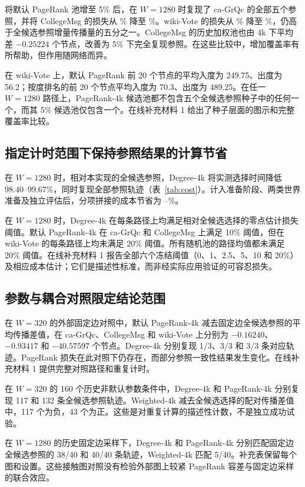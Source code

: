 \documentclass[smallextended]{svjour3}
\begin{document}
将默认 PageRank 池增至 5\% 后，在 $W=1280$ 时复现了 ca-GrQc 的全部五个参照，并将 CollegeMsg 的损失从 \CollegePRLoss{}\% 降至 \CollegePRfiveLoss{}\%。wiki-Vote 的损失从 \WikiPRLoss{}\% 降至 \WikiPRfiveLoss{}\%，仍高于全候选参照增量传播量的五分之一。CollegeMsg 的历史加权池也由 4k 下平均差 $-0.25224$ 个节点，改善为 5\% 下完全复现参照。在这些比较中，增加覆盖率有所帮助，但作用随网络而异。

在 wiki-Vote 上，默认 PageRank 前 20 个节点的平均入度为 249.75、出度为 56.2；按度排名的前 20 个节点平均入度为 70.3、出度为 489.25。在任一 $W=1280$ 路径上，PageRank-4k 候选池都不包含五个全候选参照种子中的任何一个，而其 5\% 候选池仅包含一个。在线补充材料 1 给出了种子层面的图示和完整覆盖率比较。

\subsection{指定计时范围下保持参照结果的计算节省}
在 $W=1280$ 时，相对本实现的全候选参照，Degree-4k 将实测选择时间降低 98.40--99.67\%，同时复现全部参照轨迹（表~\ref{tab:cost}）。计入准备阶段、两类世界准备及独立评估后，分项拼接的成本节省为 \CollegeDegreeSaving{}--\WikiDegreeSaving{}\%。


在 $W=1280$ 时，Degree-4k 在每条路径上均满足相对全候选选择的零点估计损失阈值。默认 PageRank-4k 在 ca-GrQc 和 CollegeMsg 上满足 10\% 阈值，但在 wiki-Vote 的每条路径上均未满足 20\% 阈值。所有随机池的路径均值都未满足 20\% 阈值。在线补充材料 1 报告全部六个冻结阈值（0、1、2.5、5、10 和 20\%）及相应成本估计；它们是描述性标准，而非经实际应用验证的可容忍损失。

\subsection{参数与耦合对照限定结论范围}

在 $W=320$ 的外部固定边对照中，默认 PageRank-4k 减去固定边全候选参照的平均传播差值，在 ca-GrQc、CollegeMsg 和 wiki-Vote 上分别为 $-0.16240$、$-0.93417$ 和 $-40.57597$ 个节点。Degree-4k 分别复现 1/3、3/3 和 3/3 条对应轨迹。PageRank 损失在此对照下仍存在，而部分参照一致性结果发生变化。在线补充材料 1 提供完整对照路径和重复计时。

在 $W=320$ 的 160 个历史非默认参数条件中，Degree-4k 和 PageRank-4k 分别复现 117 和 132 条全候选参照轨迹。Weighted-4k 减去全候选选择的配对传播差值中，117 个为负，43 个为正。这些是对重复计算的描述性计数，不是独立成功试验。

在 $W=1280$ 的历史固定边采样下，Degree-4k 和 PageRank-4k 分别匹配固定边全候选参照的 38/40 和 40/40 条轨迹，Weighted-4k 匹配 5/40。补充表保留每个图和设置。这些接触图对照没有检验外部图上较紧 PageRank 容差与固定边采样的联合效应。
\FloatBarrier
\end{document}
